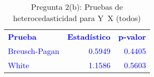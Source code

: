 \begin{table}[H]
\centering
\caption{Pregunta 2(b): Pruebas de heterocedasticidad para Y~X (todos)}
\label{tab:q2b_hetero}
\begin{tabular}{lrr}
\rowcolor{blue!10}
\toprule
\rowcolor{blue!20}
\textcolor{blue}{\textbf{Prueba}} & \textcolor{blue}{\textbf{Estadístico}} & \textcolor{blue}{\textbf{p-valor}} \\
\addlinespace
\rowcolor{blue!10}
\textcolor{blue}{Breusch-Pagan} & \textcolor{blue}{0.5949} & \textcolor{blue}{0.4405} \\
\rowcolor{blue!10}
\textcolor{blue}{White} & \textcolor{blue}{1.1586} & \textcolor{blue}{0.5603} \\
\bottomrule
\end{tabular}
\end{table}
